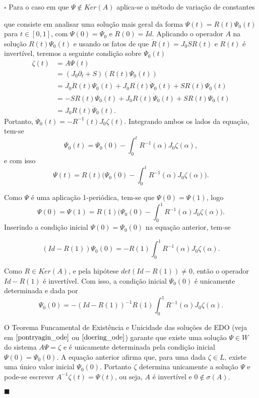 \documentclass[12pt]{book}
\newenvironment{prova}[1]{$\square$ #1}{\hfill$\blacksquare$}
\newcommand{\derivadaparcialabrev}[1]{\partial_{#1}}
\newcommand{\estruturacomplexa}{J_{0}}
\newcommand{\vermelho}[1]{{\color{red}#1}}
\begin{document}
\begin{prova}
		Para o caso em que $\Psi \notin Ker(A)$ aplica-se o método de variação de constantes 
		\begin{comment}
			\vermelho{(procurar uma referencia)} 
		\end{comment}
		que consiste em analisar uma solução mais geral da forma $\Psi(t) = R(t)\Psi_{0}(t)$ para $t \in [0,1]$, com $\Psi(0) = \Psi_{0}$ e $R(0) = Id$. Aplicando o operador $A$ na solução $R(t)\Psi_{0}(t)$ e usando os fatos de que $\dot{R}(t) = \estruturacomplexa SR(t)$ e $R(t)$ é invertível, teremos a seguinte condição sobre $\Psi_{0}(t)$
		$$
		\begin{aligned}
		\zeta(t) 
		&= A\Psi(t)
		\\ 
		&= (\estruturacomplexa\derivadaparcialabrev{t}+S)(R(t)\Psi_{0}(t)) 
		\\ 
		&= \estruturacomplexa\dot{R}(t)\Psi_{0}(t)+\estruturacomplexa R(t)\dot{\Psi}_{0}(t) + SR(t)\Psi_{0}(t)
		\\
		&= -SR(t)\Psi_{0}(t)+\estruturacomplexa R(t)\dot{\Psi}_{0}(t) + SR(t)\Psi_{0}(t)
		\\
		&= \estruturacomplexa R(t)\dot{\Psi}_{0}(t).
		\end{aligned}
		$$
		Portanto, $\dot{\Psi}_{0}(t) = -R^{-1}(t)\estruturacomplexa \zeta(t)
		$. Integrando ambos os lados da equação, tem-se
		$$
		\Psi_{0}(t) = \Psi_{0}(0)-\int_{0}^{t} R^{-1}(\alpha)\estruturacomplexa \zeta(\alpha),
		$$
		e com isso
		$$
		\Psi(t) = R(t)\Big(\Psi_{0}(0)-\int_{0}^{t} R^{-1}(\alpha)\estruturacomplexa \zeta(\alpha)\Big).
		$$
		
		Como $\Psi$ é uma aplicação 1-periódica, tem-se que $\Psi(0) = \Psi(1)$, logo
		$$
		\Psi(0)=\Psi(1)=R(1)\Big(\Psi_{0}(0)-\int_{0}^{1} R^{-1}(\alpha)\estruturacomplexa \zeta(\alpha)\Big).
		$$
		Inserindo a condição inicial $\Psi(0)=\Psi_{0}(0)$ na equação anterior, tem-se
		
		$$
		(Id - R(1))\Psi_{0}(0) = -R(1)\int_{0}^{1} R^{-1}(\alpha)\estruturacomplexa \zeta(\alpha).
		$$
		
		Como $R \in Ker(A)$, e pela hipótese $det(Id - R(1))\neq 0$, então o operador $Id - R(1)$ é invertível. Com isso, a condição inicial $\Psi_{0}(0)$ é unicamente determinada e dada por
		$$
		\Psi_{0}(0) = -(Id - R(1))^{-1}R(1)\int_{0}^{1} R^{-1}(\alpha)\estruturacomplexa \zeta(\alpha).
		$$
		
		O Teorema Funcamental de Existência e Unicidade das soluções de EDO (veja em $\cite{pontryagin_ode}$ ou $\cite{doering_ode}$) garante que existe uma solução $\Psi \in W$ do sistema $A\Psi = \zeta$ e é unicamente determinada pela condição inicial $\Psi(0) = \Psi_{0}(0)$. A equação anterior afirma que, para uma dada $\zeta \in L$, existe uma único valor inicial $\Psi_{0}(0)$. Portanto $\zeta$ determina unicamente a solução $\Psi$ e pode-se escrever $A^{-1}\zeta(t)=\Psi(t)$, ou seja, $A$ é invertível e $0 \notin \sigma(A)$.
		

\end{prova}
\end{document}
